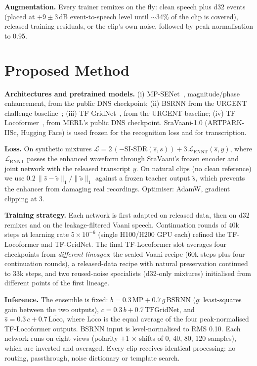 \documentclass[conference]{IEEEtran}
\begin{document}
\textbf{Augmentation.} Every trainer remixes on the fly: clean speech plus d32 events (placed at $+9\pm3$\,dB
event-to-speech level until $\sim$34\% of the clip is covered), released training residuals, or the clip's own
noise, followed by peak normalisation to 0.95.

\section{Proposed Method}
\textbf{Architectures and pretrained models.} (i) MP-SENet~\cite{mpsenet}, magnitude/phase enhancement, from the
public DNS checkpoint; (ii) BSRNN from the URGENT challenge baseline~\cite{urgent}; (iii) TF-GridNet~\cite{tfgridnet},
from the URGENT baseline; (iv) TF-Locoformer~\cite{locoformer}, from MERL's public DNS checkpoint. SraVaani-1.0
(ARTPARK-IISc, Hugging Face) is used frozen for the recognition loss and for transcription.

\textbf{Loss.} On synthetic mixtures
$\mathcal{L} = 2\,(-\mathrm{SI\text{-}SDR}(\hat s, s)) + 3\,\mathcal{L}_{\mathrm{RNNT}}(\hat s, y)$, where
$\mathcal{L}_{\mathrm{RNNT}}$ passes the enhanced waveform through SraVaani's frozen encoder and joint network
with the released transcript $y$. On natural clips (no clean reference) we use
$0.2\,\|\hat s - \tilde s\|_1/\|\tilde s\|_1$ against a frozen teacher output $\tilde s$, which prevents the
enhancer from damaging real recordings. Optimiser: AdamW, gradient clipping at 3.

\textbf{Training strategy.} Each network is first adapted on released data, then on d32 remixes and on the
leakage-filtered Vaani speech. Continuation rounds of 40k steps at learning rate $5\times10^{-6}$ (single
H100/H200 GPU each) refined the TF-Locoformer and TF-GridNet. The final TF-Locoformer slot averages four checkpoints
from \emph{different lineages}: the scaled Vaani recipe (60k steps plus four continuation rounds), a released-data
recipe with natural preservation continued to 33k steps, and two reused-noise specialists (d32-only mixtures)
initialised from different points of the first lineage.

\textbf{Inference.} The ensemble is fixed:
$b = 0.3\,\mathrm{MP} + 0.7\,g\,\mathrm{BSRNN}$ ($g$: least-squares gain between the two outputs),
$c = 0.3\,b + 0.7\,\mathrm{TFGridNet}$, and
$\hat s = 0.3\,c + 0.7\,\overline{\mathrm{Loco}}$, where $\overline{\mathrm{Loco}}$ is the equal average of the four
peak-normalised TF-Locoformer outputs. BSRNN input is level-normalised to RMS 0.10. Each network runs on eight views
(polarity $\pm1$ $\times$ shifts of 0, 40, 80, 120 samples), which are inverted and averaged. Every clip receives
identical processing: no routing, passthrough, noise dictionary or template search.
\end{document}
